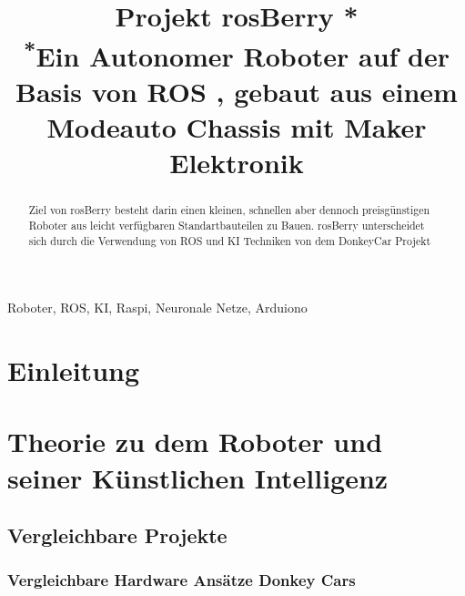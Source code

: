 \documentclass[conference]{IEEEtran}
\begin{document}
\title{Projekt rosBerry *\\
{\footnotesize \textsuperscript{*}Ein Autonomer Roboter auf der Basis von ROS , gebaut aus einem Modeauto Chassis mit Maker Elektronik}}

\author{
%
\and
{}
\and
{}
}

\maketitle

\begin{abstract}
Ziel von rosBerry besteht darin einen kleinen, schnellen aber dennoch preisgünstigen Roboter aus leicht verfügbaren Standartbauteilen zu Bauen. rosBerry unterscheidet sich durch die Verwendung von ROS und KI Techniken von dem DonkeyCar Projekt
\end{abstract}

\begin{IEEEkeywords}
Roboter, ROS, KI, Raspi, Neuronale Netze, Arduiono
\end{IEEEkeywords}

\section{Einleitung }
\section{Theorie zu dem Roboter und seiner Künstlichen Intelligenz}

\subsection{Vergleichbare Projekte}	%

\subsubsection{Vergleichbare Hardware Ansätze Donkey Cars} %
\end{document}
